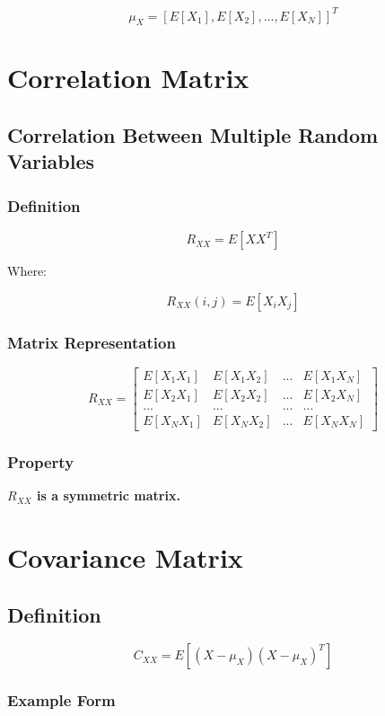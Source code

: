 \documentclass[12pt]{article}
\begin{document}
\[
\boxed{\mu_X = [E[X_1], E[X_2], ..., E[X_N]]^T}
\]

\section{Correlation Matrix}

\subsection{Correlation Between Multiple Random Variables}

\subsubsection*{\textbf{Definition}}

\[
\boxed{R_{XX} = E[XX^T]}
\]

Where:

\[
R_{XX}(i,j) = E[X_i X_j]
\]

\subsubsection*{\textbf{Matrix Representation}}

\[
R_{XX} =
\begin{bmatrix}
E[X_1X_1] & E[X_1X_2] & ... & E[X_1X_N] \\
E[X_2X_1] & E[X_2X_2] & ... & E[X_2X_N] \\
... & ... & ... & ... \\
E[X_NX_1] & E[X_NX_2] & ... & E[X_NX_N]
\end{bmatrix}
\]

\subsubsection*{\textbf{Property}}

\textbf{$R_{XX}$ is a symmetric matrix.}

\section{Covariance Matrix}

\subsection{Definition}

\[
\boxed{C_{XX} = E[(X - \mu_X)(X - \mu_X)^T]}
\]

\subsubsection*{\textbf{Example Form}}
\end{document}
